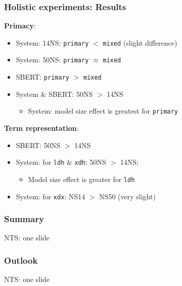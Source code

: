 \documentclass[xcolor={dvipsnames}]{beamer}
\newcommand{\param}[1]{\texttt{#1}}
\begin{document}
\begin{frame}
\frametitle{Holistic experiments: Results}

\vspace{-.5em}

\pause
\textbf{Primacy}:
\begin{itemize}
\pause
\item System: 14NS: \param{primary} $<$ \param{mixed} (slight difference)
\pause
\item System: 50NS: \param{primary} $\approx$ \param{mixed}
\pause
\item SBERT: \param{primary} $>$ \param{mixed}
\pause
\item System \& SBERT: 50NS $>$ 14NS
\begin{itemize}
\pause
\item System: model size effect is greatest for \param{primary}
\end{itemize}
\end{itemize}

\vspace{1em}

\pause
\textbf{Term representation}:
\begin{itemize}
\pause
\item SBERT: 50NS $>$ 14NS
\pause
\item System: for \param{ldh} \& \param{xdh}: 50NS $>$ 14NS;
\begin{itemize}
\pause
\item Model size effect is greater for \param{ldh}
\end{itemize}
\pause
\item System: for \param{xdx}: NS14 $>$ NS50 (very slight)
\end{itemize}

\end{frame}


\begin{frame}
\frametitle{Summary}
NTS: one slide
\end{frame}

\begin{frame}
\frametitle{Outlook}
NTS: one slide
\end{frame}
\end{document}
